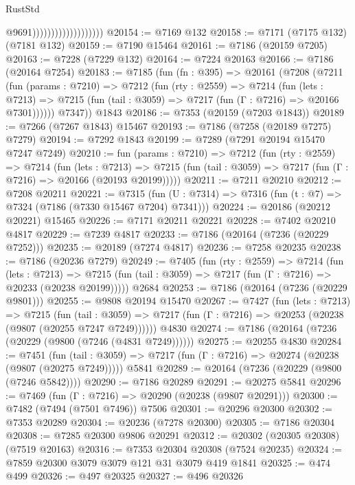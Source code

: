 \begin{lexlean}{RustStd}
\begin{coremodule}
                                          @9691)))))))))))))))))))
@20154 := @7169 @132
@20158 := @7171 (@7175 @132) (@7181 @132)
@20159 := @7190 @15464
@20161 := @7186 (@20159 @7205)
@20163 := @7228 (@7229 @132)
@20164 := @7224 @20163
@20166 := @7186 (@20164 @7254)
@20183 := @7185
    (fun (fn : @395) =>
    @20161
      (@7208
        (@7211
          (fun (params : @7210) =>
          @7212
            (fun (rty : @2559) =>
            @7214
              (fun (lets : @7213) =>
              @7215 (fun (tail : @3059) => @7217 (fun (Γ : @7216) => @20166 @7301))))))
        @7347))
    @1843
@20186 := @7353 (@20159 (@7203 @1843))
@20189 := @7266 (@7267 @1843) @15467
@20193 := @7186 (@7258 (@20189 @7275) @7279)
@20194 := @7292 @1843
@20199 := @7289 (@7291 @20194 @15470 @7247 @7249)
@20210 := fun (params : @7210) =>
  @7212
    (fun (rty : @2559) =>
    @7214
      (fun (lets : @7213) =>
      @7215 (fun (tail : @3059) => @7217 (fun (Γ : @7216) => @20166 (@20193 @20199)))))
@20211 := @7211 @20210
@20212 := @7208 @20211
@20221 := @7315
    (fun (U : @7314) => @7316 (fun (t : @7) => @7324 (@7186 (@7330 @15467 @7204) @7341)))
@20224 := @20186 (@20212 @20221) @15465
@20226 := @7171 @20211 @20221
@20228 := @7402 @20210 @4817
@20229 := @7239 @4817
@20233 := @7186 (@20164 (@7236 (@20229 @7252)))
@20235 := @20189 (@7274 @4817)
@20236 := @7258 @20235
@20238 := @7186 (@20236 @7279)
@20249 := @7405
    (fun (rty : @2559) =>
    @7214
      (fun (lets : @7213) =>
      @7215 (fun (tail : @3059) => @7217 (fun (Γ : @7216) => @20233 (@20238 @20199)))))
    @2684
@20253 := @7186 (@20164 (@7236 (@20229 @9801)))
@20255 := @9808 @20194 @15470
@20267 := @7427
    (fun (lets : @7213) =>
    @7215
      (fun (tail : @3059) =>
      @7217 (fun (Γ : @7216) => @20253 (@20238 (@9807 (@20255 @7247 @7249))))))
    @4830
@20274 := @7186 (@20164 (@7236 (@20229 (@9800 (@7246 (@4831 @7249))))))
@20275 := @20255 @4830
@20284 := @7451
    (fun (tail : @3059) => @7217 (fun (Γ : @7216) => @20274 (@20238 (@9807 (@20275 @7249)))))
    @5841
@20289 := @20164 (@7236 (@20229 (@9800 (@7246 @5842))))
@20290 := @7186 @20289
@20291 := @20275 @5841
@20296 := @7469 (fun (Γ : @7216) => @20290 (@20238 (@9807 @20291)))
@20300 := @7482 (@7494 (@7501 @7496)) @7506
@20301 := @20296 @20300
@20302 := @7353 @20289
@20304 := @20236 (@7278 @20300)
@20305 := @7186 @20304
@20308 := @7285 @20300 @9806 @20291
@20312 := @20302 (@20305 @20308) (@7519 @20163)
@20316 := @7353 @20304 @20308 (@7524 @20235)
@20324 := @7859 @20300 @3079 @3079 @121 @31 @3079 @419 @1841
@20325 := @474 @499
@20326 := @497 @20325
@20327 := @496 @20326

\end{coremodule}
\end{lexlean}

